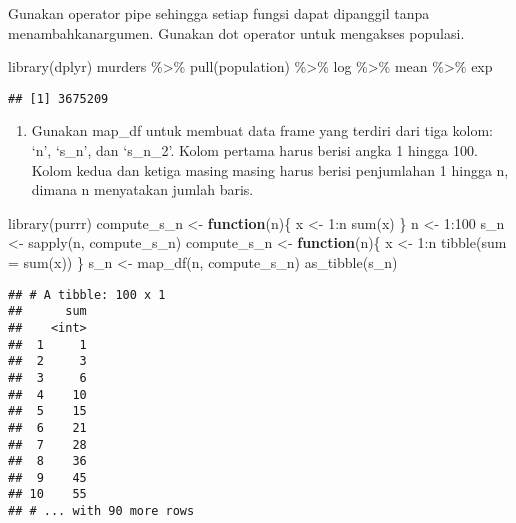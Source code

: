 \documentclass[
]{article}
\newenvironment{Shaded}{\begin{snugshade}}{\end{snugshade}}
\newcommand{\AttributeTok}[1]{\textcolor[rgb]{0.77,0.63,0.00}{#1}}
\newcommand{\ControlFlowTok}[1]{\textcolor[rgb]{0.13,0.29,0.53}{\textbf{#1}}}
\newcommand{\DecValTok}[1]{\textcolor[rgb]{0.00,0.00,0.81}{#1}}
\newcommand{\FunctionTok}[1]{\textcolor[rgb]{0.00,0.00,0.00}{#1}}
\newcommand{\NormalTok}[1]{#1}
\newcommand{\OtherTok}[1]{\textcolor[rgb]{0.56,0.35,0.01}{#1}}
\newcommand{\SpecialCharTok}[1]{\textcolor[rgb]{0.00,0.00,0.00}{#1}}
\providecommand{\tightlist}{%
  \setlength{\itemsep}{0pt}\setlength{\parskip}{0pt}}
\begin{document}
Gunakan operator pipe sehingga setiap fungsi dapat dipanggil tanpa
menambahkanargumen. Gunakan dot operator untuk mengakses populasi.

\begin{Shaded}
\begin{Highlighting}[]
\FunctionTok{library}\NormalTok{(dplyr)}
\NormalTok{murders }\SpecialCharTok{\%\textgreater{}\%} \FunctionTok{pull}\NormalTok{(population) }\SpecialCharTok{\%\textgreater{}\%}\NormalTok{ log }\SpecialCharTok{\%\textgreater{}\%}\NormalTok{ mean }\SpecialCharTok{\%\textgreater{}\%}\NormalTok{ exp}
\end{Highlighting}
\end{Shaded}

\begin{verbatim}
## [1] 3675209
\end{verbatim}

\begin{enumerate}
\def\labelenumi{\arabic{enumi}.}
\setcounter{enumi}{3}
\tightlist
\item
  Gunakan map\_df untuk membuat data frame yang terdiri dari tiga kolom:
  `n', `s\_n', dan `s\_n\_2'. Kolom pertama harus berisi angka 1 hingga
  100. Kolom kedua dan ketiga masingmasing harus berisi penjumlahan 1
  hingga n, dimana n menyatakan jumlah baris.
\end{enumerate}

\begin{Shaded}
\begin{Highlighting}[]
\FunctionTok{library}\NormalTok{(purrr)}
\NormalTok{compute\_s\_n }\OtherTok{\textless{}{-}} \ControlFlowTok{function}\NormalTok{(n)\{ }
\NormalTok{ x }\OtherTok{\textless{}{-}} \DecValTok{1}\SpecialCharTok{:}\NormalTok{n }
 \FunctionTok{sum}\NormalTok{(x) }
\NormalTok{\} }
\NormalTok{n }\OtherTok{\textless{}{-}} \DecValTok{1}\SpecialCharTok{:}\DecValTok{100} 
\NormalTok{s\_n }\OtherTok{\textless{}{-}} \FunctionTok{sapply}\NormalTok{(n, compute\_s\_n)}
\NormalTok{compute\_s\_n }\OtherTok{\textless{}{-}} \ControlFlowTok{function}\NormalTok{(n)\{ }
\NormalTok{ x }\OtherTok{\textless{}{-}} \DecValTok{1}\SpecialCharTok{:}\NormalTok{n }
 \FunctionTok{tibble}\NormalTok{(}\AttributeTok{sum =} \FunctionTok{sum}\NormalTok{(x)) }
\NormalTok{\} }
\NormalTok{s\_n }\OtherTok{\textless{}{-}} \FunctionTok{map\_df}\NormalTok{(n, compute\_s\_n)}
\FunctionTok{as\_tibble}\NormalTok{(s\_n)}
\end{Highlighting}
\end{Shaded}

\begin{verbatim}
## # A tibble: 100 x 1
##      sum
##    <int>
##  1     1
##  2     3
##  3     6
##  4    10
##  5    15
##  6    21
##  7    28
##  8    36
##  9    45
## 10    55
## # ... with 90 more rows
\end{verbatim}
\end{document}
